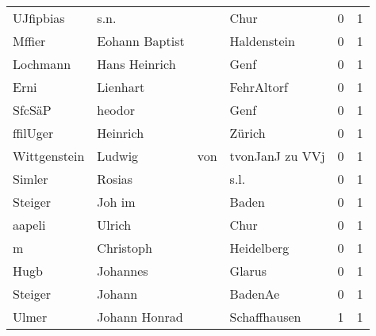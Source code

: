 \begin{tabular}{llllrr}
                UJfipbias &                               s.n. &             &                                        Chur &          0 &         1 \\
                   Mffier &                     Eohann Baptist &             &                                 Haldenstein &          0 &         1 \\
                 Lochmann &                      Hans Heinrich &             &                                        Genf &          0 &         1 \\
                     Erni &                           Lienhart &             &                                  FehrAltorf &          0 &         1 \\
                   SfcSäP &                             heodor &             &                                        Genf &          0 &         1 \\
                 ffilUger &                           Heinrich &             &                                      Zürich &          0 &         1 \\
             Wittgenstein &                             Ludwig &         von &                             tvonJanJ zu VVj &          0 &         1 \\
                   Simler &                             Rosias &             &                                        s.l. &          0 &         1 \\
                  Steiger &                             Joh im &             &                                       Baden &          0 &         1 \\
                   aapeli &                             Ulrich &             &                                        Chur &          0 &         1 \\
                        m &                          Christoph &             &                                  Heidelberg &          0 &         1 \\
                     Hugb &                           Johannes &             &                                      Glarus &          0 &         1 \\
                  Steiger &                             Johann &             &                                     BadenAe &          0 &         1 \\
                    Ulmer &                      Johann Honrad &             &                                Schaffhausen &          1 &         1 \\

\end{tabular}
